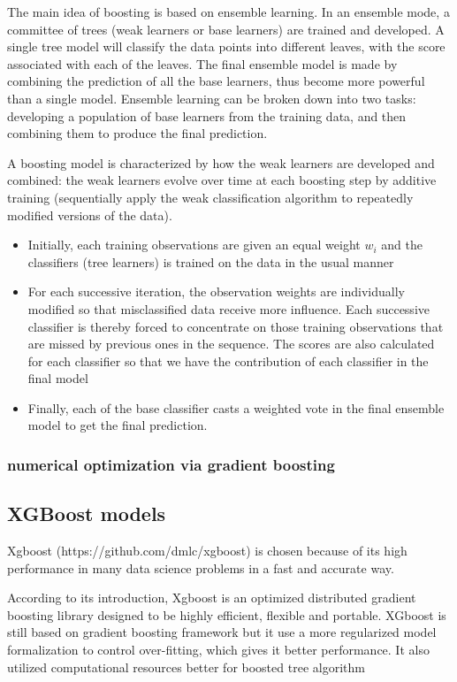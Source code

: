 \documentclass[journal,twocolumn,letterpaper]{IEEEJERM}
\begin{document}
The main idea of boosting is based on ensemble learning. In an ensemble mode, a committee of trees (weak learners or base learners) are trained and developed. A single tree model will classify the data points into different leaves, with the score associated with each of the leaves. The final ensemble model is made by combining the prediction of all the base learners, thus become more powerful than a single model. Ensemble learning can be broken down into two tasks: developing a population of base learners from the training data, and then combining them to produce the final prediction.

A boosting model is characterized by how the weak learners are developed and combined: the weak learners evolve over time at each boosting step by additive training (sequentially apply the weak classification algorithm to repeatedly modified versions of the data). \begin{itemize}
\item Initially,  each training observations are given an equal weight $w_i$
and the classifiers (tree learners) is trained on the data in the usual manner
\item For each successive iteration, the observation weights are individually modified so that misclassified data receive more influence. Each successive classifier is thereby forced to concentrate on those training observations that are missed by previous ones in the sequence. The scores are also calculated for each classifier so that we have the contribution of each classifier in the final model
\item Finally, each of the base classifier casts a weighted vote in the final ensemble model to get the final prediction.
\end{itemize}

\subsubsection{numerical optimization via gradient boosting}

\subsection{XGBoost models }
Xgboost (https://github.com/dmlc/xgboost) is chosen because of its high performance in many data science problems in a fast and accurate way.

According to its introduction, Xgboost is an optimized distributed gradient boosting library designed to be highly efficient, flexible and portable. XGboost is still based on gradient boosting framework but it use a more regularized model formalization to control over-fitting, which gives it better performance. It also utilized computational resources better for boosted tree algorithm
\end{document}

